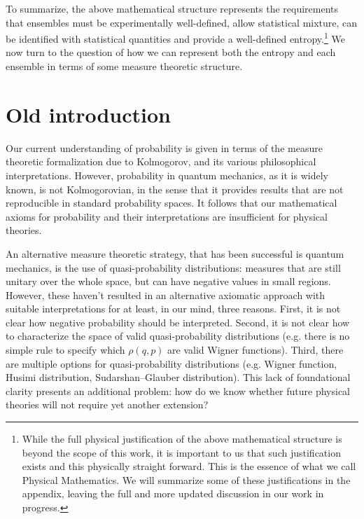 \documentclass[10pt,twocolumn, nofootinbib]{revtex4-2}
\begin{document}
To summarize, the above mathematical structure represents the requirements that ensembles must be experimentally well-defined, allow statistical mixture, can be identified with statistical quantities and provide a well-defined entropy.\footnote{While the full physical justification of the above mathematical structure is beyond the scope of this work, it is important to us that such justification exists and this physically straight forward. This is the essence of what we call Physical Mathematics. We will summarize some of these justifications in the appendix, leaving the full and more updated discussion in our work in progress.} We now turn to the question of how we can represent both the entropy and each ensemble in terms of some measure theoretic structure.

\section{Old introduction}

Our current understanding of probability is given in terms of the measure theoretic formalization due to Kolmogorov, and its various philosophical interpretations. However, probability in quantum mechanics, as it is widely known, is not Kolmogorovian, in the sense that it provides results that are not reproducible in standard probability spaces. It follows that our mathematical axioms for probability and their interpretations are insufficient for physical theories.

An alternative measure theoretic strategy, that has been successful is quantum mechanics, is the use of quasi-probability distributions: measures that are still unitary over the whole space, but can have negative values in small regions. However, these haven't resulted in an alternative axiomatic approach with suitable interpretations for at least, in our mind, three reasons. First, it is not clear how negative probability should be interpreted. Second, it is not clear how to characterize the space of valid quasi-probability distributions (e.g. there is no simple rule to specify which $\rho(q,p)$ are valid Wigner functions). Third, there are multiple options for quasi-probability distributions (e.g. Wigner function, Husimi distribution, Sudarshan–Glauber distribution). This lack of foundational clarity presents an additional problem: how do we know whether future physical theories will not require yet another extension?
\end{document}
